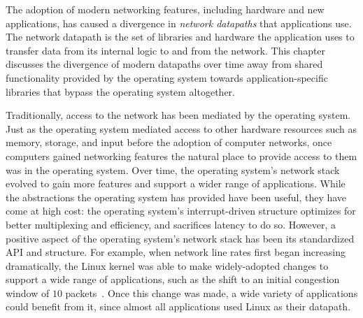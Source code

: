 The adoption of modern networking features, including hardware and new applications, has caused a divergence in \emph{network datapaths} that applications use. The network datapath is the set of libraries and hardware the application uses to transfer data from its internal logic to and from the network. 
This chapter discusses the divergence of modern datapaths over time away from shared functionality provided by the operating system towards application-specific libraries that bypass the operating system altogether.

Traditionally, access to the network has been mediated by the operating system. Just as the operating system mediated access to other hardware resources such as memory, storage, and input before the adoption of computer networks, once computers gained networking features the natural place to provide access to them was in the operating system.
Over time, the operating system's network stack evolved to gain more features and support a wider range of applications. While the abstractions the operating system has provided have been useful, they have come at high cost: the operating system's interrupt-driven structure optimizes for better multiplexing and efficiency, and sacrifices latency to do so.
However, a positive aspect of the operating system's network stack has been its standardized API and structure. 
For example, when network line rates first began increasing dramatically, the Linux kernel was able to make widely-adopted changes to support a wide range of applications, such as the shift to an initial congestion window of $10$ packets~\cite{iw10}. Once this change was made, a wide variety of applications could benefit from it, since almost all applications used Linux as their datapath.

